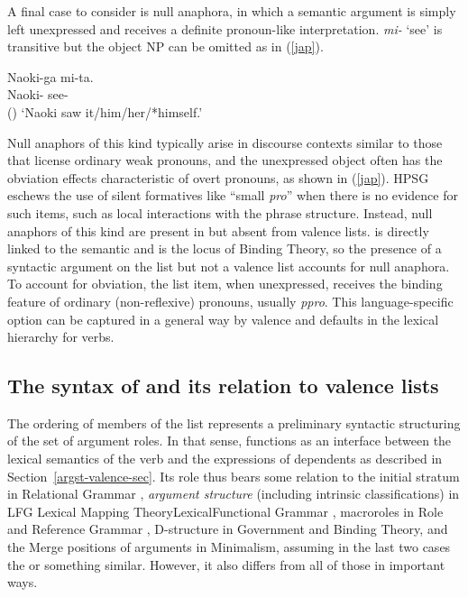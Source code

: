 \documentclass[output=paper,biblatex,babelshorthands,newtxmath,draftmode,colorlinks, citecolor=brown]{langscibook}
\begin{document}
A final case to consider is null anaphora, in which a semantic argument is simply left unexpressed
and receives a definite pronoun-like interpretation.   \textit{mi-} `see' is
transitive but the object NP can be omitted as in (\ref{jap}).

\ea
\label{jap}
\gll Naoki-ga       mi-ta.  \\
     Naoki- see-  \\\hfill()
\glt `Naoki saw it/him/her/*himself.'
\z

\noindent
Null anaphors of this kind typically arise in discourse contexts similar to those that license
ordinary weak pronouns, and the unexpressed object often has the obviation effects characteristic of
overt pronouns, as shown in (\ref{jap}).  HPSG eschews the use of silent formatives
like ``small \textit{pro}'' when there is no evidence for such items, such as local interactions with
the phrase structure.  Instead, null anaphors of this kind are present in \argst but absent from
valence lists.  \argst is directly linked to the semantic \content and is the locus of Binding Theory,
so the presence of a syntactic argument on the \argst list but not a valence list accounts for null
anaphora. To account for obviation, the \argst list item, when unexpressed, receives the
binding feature of ordinary (non-reflexive) pronouns, usually \textit{ppro}.  This language-specific
option can be captured in a general way by valence and \argst defaults in the lexical hierarchy for
verbs.

\subsection{The syntax of  \texorpdfstring{\argst}{ARG-ST} and its relation to  valence lists}
\label{argst-sec}


The ordering of members of the \argst list represents a preliminary syntactic structuring of the set
of argument roles.  In that sense, \argst functions as an interface between the lexical semantics of
the verb and the expressions of dependents as described in Section~\ref{argst-valence-sec}.  Its
role thus bears some relation to the initial stratum in Relational Grammar
\citep{PerlmutterandPostal1984}, \textit{argument structure} (including
intrinsic classifications) in LFG Lexical Mapping TheoryLexical\indexlfg Functional Grammar
\citep{Bresnan+etal:2015}, macroroles in Role and Reference Grammar \citep{VanValinandLapolla1997},
D-structure in Government and Binding Theory, and the Merge positions of arguments in
Minimalism, assuming in the last two cases the 
\citep[46]{Baker1988} or something similar.  However, it also differs from all of those in important
ways.
\end{document}
